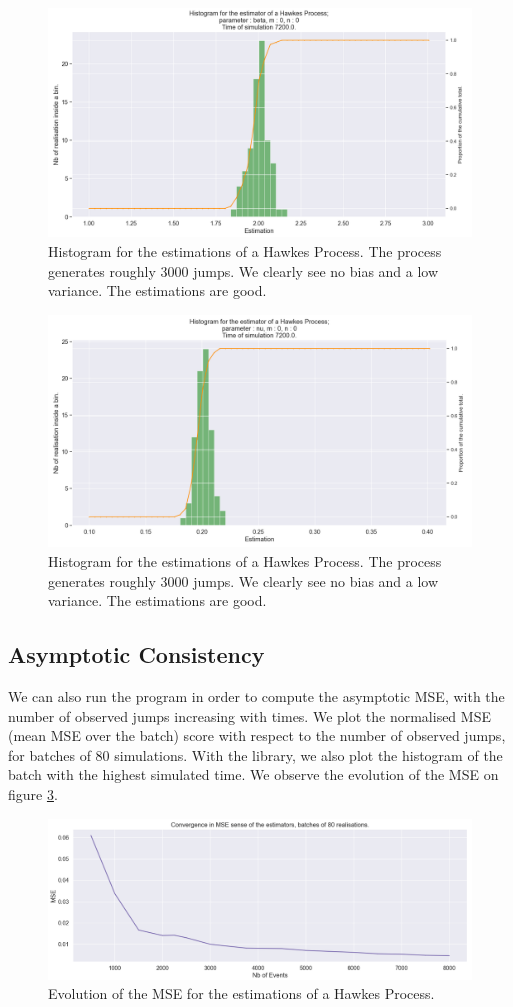 \begin{figure}
\centering
\includegraphics[width = 0.75 \textwidth]{../imag/chap2/hist_2.png}
\caption{Histogram for the estimations of a Hawkes Process. The process generates roughly 3000 jumps. We clearly see no bias and a low variance. The estimations are good.}
\label{fig:hist_1_beta}
\end{figure}


\begin{figure}
\centering
\includegraphics[width = 0.75 \textwidth]{../imag/chap2/hist_3.png}
\caption{Histogram for the estimations of a Hawkes Process. The process generates roughly 3000 jumps. We clearly see no bias and a low variance. The estimations are good.}
\label{fig:hist_1_nu}
\end{figure}


\subsection{Asymptotic Consistency}

We can also run the program in order to compute the asymptotic MSE, with the number of observed jumps increasing with times. We plot the normalised MSE (mean MSE over the batch) score with respect to the number of observed jumps, for batches of 80 simulations. With the library, we also plot the histogram of the batch with the highest simulated time. We observe the evolution of the MSE on figure \ref{fig:MSE_1}.





\begin{figure}
\centering
\includegraphics[width = 0.99 \textwidth]{../imag/chap2/MSE_score.png}
\caption{Evolution of the MSE for the estimations of a Hawkes Process.}
\label{fig:MSE_1}
\end{figure}
